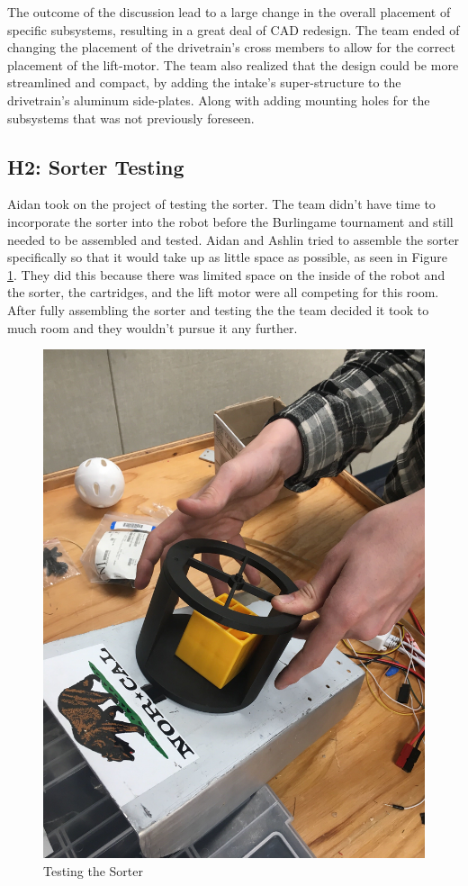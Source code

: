\documentclass{article}
\begin{document}
The outcome of the discussion lead to a large change in the overall placement of specific subsystems, resulting in a great deal of CAD redesign. The team ended of changing the placement of the drivetrain's cross members to allow for the correct placement of the lift-motor. The team also realized that the design could be more streamlined and compact, by adding the intake's super-structure to the drivetrain's aluminum side-plates. Along with adding mounting holes for the subsystems that was not previously foreseen.  \\


\subsection{H2: Sorter Testing}

Aidan took on the project of testing the sorter. The team didn't have time to incorporate the sorter into the robot before the Burlingame tournament and still needed to be assembled and tested. Aidan and Ashlin tried to assemble the sorter specifically so that it would take up as little space as possible, as seen in Figure \ref{fig:sortertesting}. They did this because there was limited space on the inside of the robot and the sorter, the cartridges, and the lift motor were all competing for this room. After fully assembling the sorter and testing the the team decided it took to much room and they wouldn't pursue it any further.

\begin{figure}
    \centering
    \includegraphics[width=.6 \textwidth]{13_11-26/images/sorting.JPG}
    \caption{Testing the Sorter}
    \label{fig:sortertesting}
\end{figure}
\end{document}
